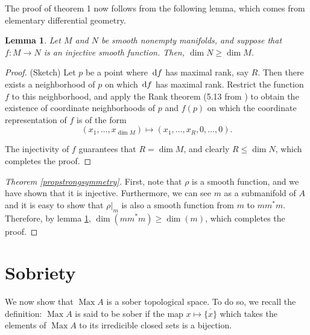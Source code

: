 \documentclass{article}
\theoremstyle{plain}
\newtheorem{lemma}{Lemma}
\theoremstyle{nonumberplain}
\newtheorem{proof}{Proof}
\DeclareMathOperator{\Max}{Max}
\begin{document}
The proof of theorem 1 now follows from the following lemma, which comes from elementary differential geometry.

\begin{lemma}\label{lemma1}
Let $M$ and $N$ be smooth nonempty manifolds, and suppose that $f \colon M \to N$ is an injective smooth function. Then, $\dim N \geq \dim M$.
\end{lemma}

\begin{proof} (Sketch)
Let $p$ be a point where $\dl f$ has maximal rank, say $R$. Then there exists a neighborhood of $p$ on which $\dl f$ has maximal rank. Restrict the function $f$ to this neighborhood, and apply the Rank theorem (5.13 from \cite{leesmooth}) to obtain the existence of coordinate neighborhoods of $p$ and $f(p)$ on which the coordinate representation of $f$ is of the form
\begin{equation}
(x_1, \dots, x_{\dim M}) \mapsto (x_1, \dots, x_R, 0, \dots, 0).
\end{equation}

The injectivity of $f$ guarantees that $R = \dim M$, and clearly $R \leq \dim N$, which completes the proof.
\end{proof}

\begin{proof}[Theorem \ref{propstrongsymmetry}]
First, note that $\rho$ is a smooth function, and we have shown that it is injective. Furthermore, we can see $m$ as a submanifold of $A$ and it is easy to show that $\rho|_m$ is also a smooth function from $m$ to $m m^* m$. Therefore, by lemma \ref{lemma1}, $\dim(m m^* m) \geq \dim(m)$, which completes the proof.
\end{proof}

\section{Sobriety}

We now show that $\Max A$ is a sober topological space. To do so, we recall the definition: $\Max A$ is said to be sober if the map $x \mapsto \overline{\{x\}}$ which takes the elements of $\Max A$ to its irredicible closed sets is a bijection.

\nocite{measurement}

{}

\end{document}
